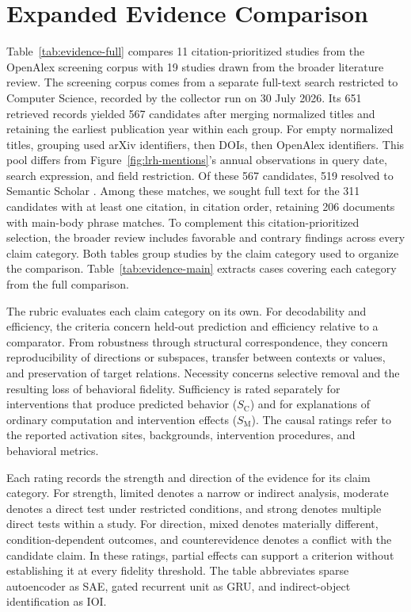 \documentclass[11pt]{article}
\newcommand{\appendixsection}[1]{%
  \section{#1}%
  \addcontentsline{atc}{section}{\protect\numberline{\thesection}#1}%
}
\begin{document}
\clearpage
\twocolumn

\appendixsection{Expanded Evidence Comparison}
\label{sec:evidence-comparison}

Table~\ref{tab:evidence-full} compares 11 citation-prioritized studies from the OpenAlex screening corpus with 19 studies drawn from the broader literature review.
The screening corpus comes from a separate full-text search restricted to Computer Science, recorded by the collector run on 30 July 2026.
Its 651 retrieved records yielded 567 candidates after merging normalized titles and retaining the earliest publication year within each group.
For empty normalized titles, grouping used arXiv identifiers, then DOIs, then OpenAlex identifiers.
This pool differs from Figure~\ref{fig:lrh-mentions}'s annual observations in query date, search expression, and field restriction.
Of these 567 candidates, 519 resolved to Semantic Scholar \citep{ammar2018semantic}.
Among these matches, we sought full text for the 311 candidates with at least one citation, in citation order, retaining 206 documents with main-body phrase matches.
To complement this citation-prioritized selection, the broader review includes favorable and contrary findings across every claim category.
Both tables group studies by the claim category used to organize the comparison.
Table~\ref{tab:evidence-main} extracts cases covering each category from the full comparison.

The rubric evaluates each claim category on its own.
For decodability and efficiency, the criteria concern held-out prediction and efficiency relative to a comparator.
From robustness through structural correspondence, they concern reproducibility of directions or subspaces, transfer between contexts or values, and preservation of target relations.
Necessity concerns selective removal and the resulting loss of behavioral fidelity.
Sufficiency is rated separately for interventions that produce predicted behavior ($S_{\mathrm C}$) and for explanations of ordinary computation and intervention effects ($S_{\mathrm M}$).
The causal ratings refer to the reported activation sites, backgrounds, intervention procedures, and behavioral metrics.

Each rating records the strength and direction of the evidence for its claim category.
For strength, limited denotes a narrow or indirect analysis, moderate denotes a direct test under restricted conditions, and strong denotes multiple direct tests within a study.
For direction, mixed denotes materially different, condition-dependent outcomes, and counterevidence denotes a conflict with the candidate claim.
In these ratings, partial effects can support a criterion without establishing it at every fidelity threshold.
The table abbreviates sparse autoencoder as SAE, gated recurrent unit as GRU, and indirect-object identification as IOI.
\end{document}
